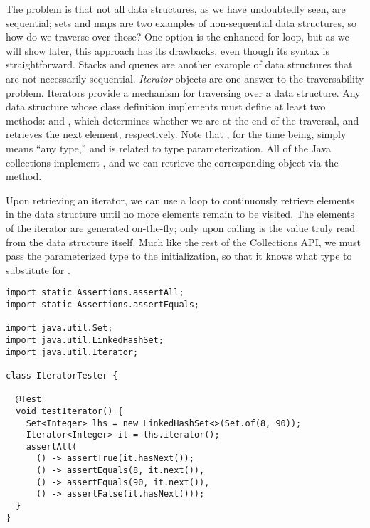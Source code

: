 The problem is that not all data structures, as we have undoubtedly seen, are sequential; sets and maps are two examples of non-sequential data structures, so how do we traverse over those? 
One option is the enhanced-for loop, but as we will show later, this approach has its drawbacks, even though its syntax is straightforward. 
Stacks and queues are another example of data structures that are not necessarily sequential. 
\emph{Iterator} objects are one answer to the traversability problem. 
Iterators provide a mechanism for traversing over a data structure. 
Any data structure whose class definition implements  must define at least two methods:  and , which determines whether we are at the end of the traversal, and retrieves the next element, respectively. 
Note that , for the time being, simply means ``any type,'' and is related to type parameterization.
All of the Java collections implement , and we can retrieve the corresponding  object via the  method. 

Upon retrieving an iterator, we can use a  loop to continuously retrieve elements in the data structure until no more elements remain to be visited. 
The elements of the iterator are generated on-the-fly; only upon calling  is the value truly read from the data structure itself. 
Much like the rest of the Collections API, we must pass the parameterized type to the  initialization, so that it knows what type to substitute for .


\begin{lstlisting}[language=MyJava]
import static Assertions.assertAll;
import static Assertions.assertEquals;

import java.util.Set;
import java.util.LinkedHashSet;
import java.util.Iterator;

class IteratorTester {

  @Test
  void testIterator() {
    Set<Integer> lhs = new LinkedHashSet<>(Set.of(8, 90));
    Iterator<Integer> it = lhs.iterator();
    assertAll(
      () -> assertTrue(it.hasNext());
      () -> assertEquals(8, it.next()),
      () -> assertEquals(90, it.next()),
      () -> assertFalse(it.hasNext()));
  }
} 
\end{lstlisting}

